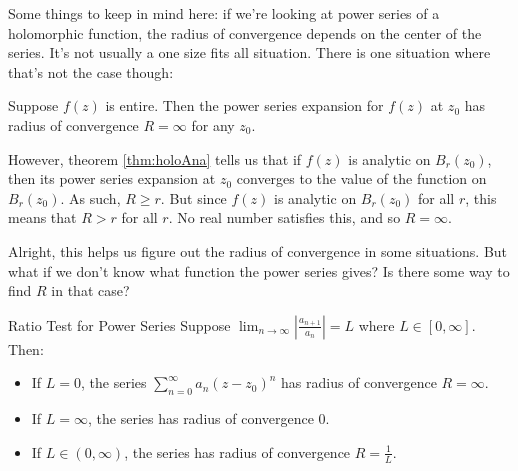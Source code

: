 Some things to keep in mind here: if we're looking at power series of a holomorphic function, the radius of convergence depends on the center of the series. It's not usually a one size fits all situation. There is one situation where that's not the case though:

\begin{ex}{}{} Suppose $f(z)$ is entire. Then the power series expansion for $f(z)$ at $z_0$ has radius of convergence $R = \infty$ for any $z_0$.

However, theorem \ref{thm:holoAna} tells us that if $f(z)$ is analytic on $B_r(z_0)$, then its power series expansion at $z_0$ converges to the value of the function on $B_r(z_0)$. As such, $R\ge r$. But since $f(z)$ is analytic on $B_r(z_0)$ for all $r$, this means that $R> r$ for all $r$. No real number satisfies this, and so $R = \infty$.
\end{ex}

Alright, this helps us figure out the radius of convergence in some situations. But what if we don't know what function the power series gives? Is there some way to find $R$ in that case?

\begin{thmbo}{Ratio Test for Power Series}{}
Suppose $\lim_{n \rightarrow \infty} \left|\frac{a_{n+1}}{a_n}\right| = L$ where $L \in [0,\infty]$. Then:

\begin{itemize} 
\item If $L = 0$, the series $\sum_{n = 0}^\infty a_n(z-z_0)^n$ has radius of convergence $R = \infty$.
\item If $L = \infty$, the series has radius of convergence $0$.
\item If $L\in (0,\infty)$, the series has radius of convergence $R = \frac{1}{L}$.
\end{itemize}
\end{thmbo}

